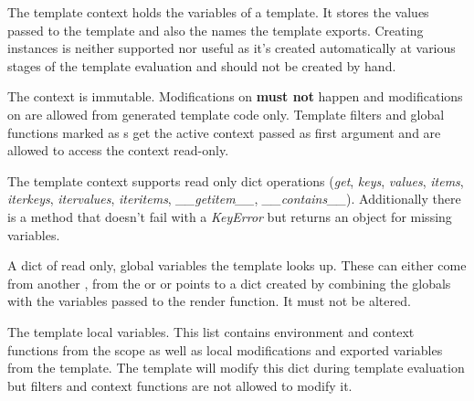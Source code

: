 \documentclass[a4paper,10pt,english]{sphinxmanual}
\begin{document}
\begin{fulllineitems}
\label{api:jinja2.runtime.Context}
The template context holds the variables of a template.  It stores the
values passed to the template and also the names the template exports.
Creating instances is neither supported nor useful as it's created
automatically at various stages of the template evaluation and should not
be created by hand.

The context is immutable.  Modifications on {\hyperref[api:jinja2.Context.parent]{}} \textbf{must not}
happen and modifications on {\hyperref[api:jinja2.Context.vars]{}} are allowed from generated
template code only.  Template filters and global functions marked as
{\hyperref[api:jinja2.contextfunction]{}}s get the active context passed as first argument
and are allowed to access the context read-only.

The template context supports read only dict operations (\emph{get},
\emph{keys}, \emph{values}, \emph{items}, \emph{iterkeys}, \emph{itervalues}, \emph{iteritems},
\emph{\_\_getitem\_\_}, \emph{\_\_contains\_\_}).  Additionally there is a 
method that doesn't fail with a \emph{KeyError} but returns an
{\hyperref[api:jinja2.Undefined]{}} object for missing variables.

\begin{fulllineitems}
\label{api:jinja2.Context.parent}
A dict of read only, global variables the template looks up.  These
can either come from another , from the
{\hyperref[api:jinja2.Environment.globals]{}} or {\hyperref[api:jinja2.Template.globals]{}} or points
to a dict created by combining the globals with the variables
passed to the render function.  It must not be altered.

\end{fulllineitems}


\begin{fulllineitems}
\label{api:jinja2.Context.vars}
The template local variables.  This list contains environment and
context functions from the {\hyperref[api:jinja2.Context.parent]{}} scope as well as local
modifications and exported variables from the template.  The template
will modify this dict during template evaluation but filters and
context functions are not allowed to modify it.


\end{fulllineitems}
\end{fulllineitems}
\end{document}
